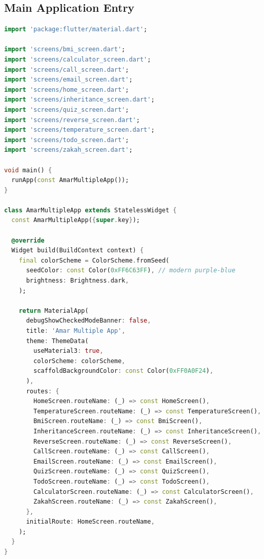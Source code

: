 \documentclass{article}
\begin{document}
\subsection*{Main Application Entry}
\begin{lstlisting}[language=Dart, caption={\texttt{\detokenize{lib/main.dart}}}]
import 'package:flutter/material.dart';

import 'screens/bmi_screen.dart';
import 'screens/calculator_screen.dart';
import 'screens/call_screen.dart';
import 'screens/email_screen.dart';
import 'screens/home_screen.dart';
import 'screens/inheritance_screen.dart';
import 'screens/quiz_screen.dart';
import 'screens/reverse_screen.dart';
import 'screens/temperature_screen.dart';
import 'screens/todo_screen.dart';
import 'screens/zakah_screen.dart';

void main() {
  runApp(const AmarMultipleApp());
}

class AmarMultipleApp extends StatelessWidget {
  const AmarMultipleApp({super.key});

  @override
  Widget build(BuildContext context) {
    final colorScheme = ColorScheme.fromSeed(
      seedColor: const Color(0xFF6C63FF), // modern purple-blue
      brightness: Brightness.dark,
    );

    return MaterialApp(
      debugShowCheckedModeBanner: false,
      title: 'Amar Multiple App',
      theme: ThemeData(
        useMaterial3: true,
        colorScheme: colorScheme,
        scaffoldBackgroundColor: const Color(0xFF0A0F24),
      ),
      routes: {
        HomeScreen.routeName: (_) => const HomeScreen(),
        TemperatureScreen.routeName: (_) => const TemperatureScreen(),
        BmiScreen.routeName: (_) => const BmiScreen(),
        InheritanceScreen.routeName: (_) => const InheritanceScreen(),
        ReverseScreen.routeName: (_) => const ReverseScreen(),
        CallScreen.routeName: (_) => const CallScreen(),
        EmailScreen.routeName: (_) => const EmailScreen(),
        QuizScreen.routeName: (_) => const QuizScreen(),
        TodoScreen.routeName: (_) => const TodoScreen(),
        CalculatorScreen.routeName: (_) => const CalculatorScreen(),
        ZakahScreen.routeName: (_) => const ZakahScreen(),
      },
      initialRoute: HomeScreen.routeName,
    );
  }
}
\end{lstlisting}
\end{document}
